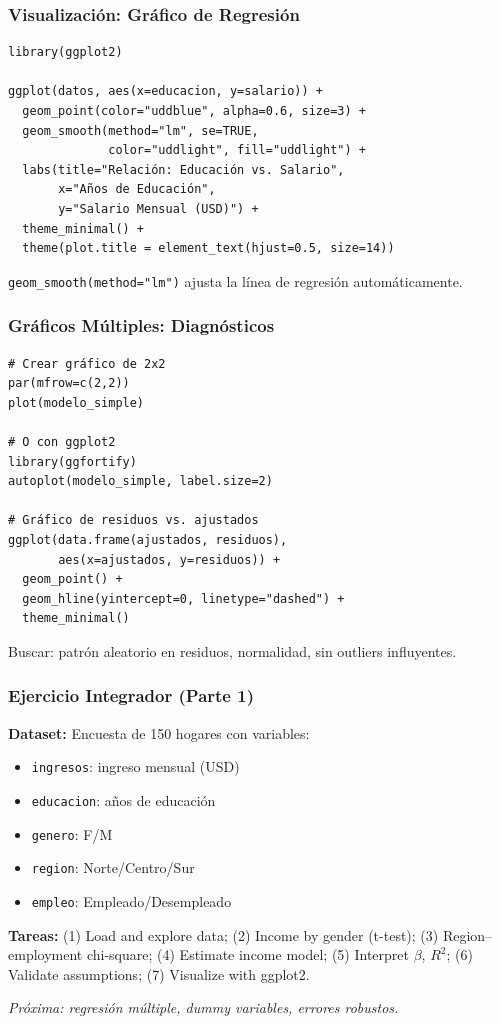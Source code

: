 \documentclass[aspectratio=169,11pt]{beamer}
\begin{document}
\begin{frame}[fragile]
  \frametitle{Visualización: Gráfico de Regresión}

  \begin{lstlisting}
library(ggplot2)

ggplot(datos, aes(x=educacion, y=salario)) +
  geom_point(color="uddblue", alpha=0.6, size=3) +
  geom_smooth(method="lm", se=TRUE,
              color="uddlight", fill="uddlight") +
  labs(title="Relación: Educación vs. Salario",
       x="Años de Educación",
       y="Salario Mensual (USD)") +
  theme_minimal() +
  theme(plot.title = element_text(hjust=0.5, size=14))
  \end{lstlisting}

  \small
  \texttt{geom\_smooth(method="lm")} ajusta la línea de regresión automáticamente.
\end{frame}

\begin{frame}[fragile]
  \frametitle{Gráficos Múltiples: Diagnósticos}

  \begin{lstlisting}
# Crear gráfico de 2x2
par(mfrow=c(2,2))
plot(modelo_simple)

# O con ggplot2
library(ggfortify)
autoplot(modelo_simple, label.size=2)

# Gráfico de residuos vs. ajustados
ggplot(data.frame(ajustados, residuos),
       aes(x=ajustados, y=residuos)) +
  geom_point() +
  geom_hline(yintercept=0, linetype="dashed") +
  theme_minimal()
  \end{lstlisting}

  \small
  Buscar: patrón aleatorio en residuos, normalidad, sin outliers influyentes.
\end{frame}

\begin{frame}
  \frametitle{Ejercicio Integrador (Parte 1)}

  \small
  \textbf{Dataset:} Encuesta de 150 hogares con variables:
  \begin{itemize}
    \item \texttt{ingresos}: ingreso mensual (USD)
    \item \texttt{educacion}: años de educación
    \item \texttt{genero}: F/M
    \item \texttt{region}: Norte/Centro/Sur
    \item \texttt{empleo}: Empleado/Desempleado
  \end{itemize}

  \vspace{0.2cm}
  \small
  \textbf{Tareas:} (1) Load and explore data; (2) Income by gender (t-test); (3) Region--employment chi-square; (4) Estimate income model; (5) Interpret $\beta$, $R^2$; (6) Validate assumptions; (7) Visualize with ggplot2.

  \vspace{0.2cm}
  \tiny \textit{Próxima: regresión múltiple, dummy variables, errores robustos.}
\end{frame}
\end{document}
